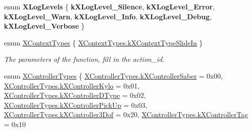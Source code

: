 \begin{DoxyCompactItemize}
\item 
\mbox{\label{class_ximmerse_1_1_input_system_1_1_x_device_plugin_a6e7bd1d7c7750fcdeb271defafc86bea}} 
enum {\bfseries X\+Log\+Levels} \{ \newline
{\bfseries k\+X\+Log\+Level\+\_\+\+Silence}, 
{\bfseries k\+X\+Log\+Level\+\_\+\+Error}, 
{\bfseries k\+X\+Log\+Level\+\_\+\+Warn}, 
{\bfseries k\+X\+Log\+Level\+\_\+\+Info}, 
\newline
{\bfseries k\+X\+Log\+Level\+\_\+\+Debug}, 
{\bfseries k\+X\+Log\+Level\+\_\+\+Verbose}
 \}
\item 
enum \mbox{\hyperlink{class_ximmerse_1_1_input_system_1_1_x_device_plugin_ab11d2f358709ce84ff419eae941f16d6}{X\+Context\+Types}} \{ \mbox{\hyperlink{class_ximmerse_1_1_input_system_1_1_x_device_plugin_ab11d2f358709ce84ff419eae941f16d6a4aad06142d58cf0d02c54672d88f2632}{X\+Context\+Types.\+k\+X\+Context\+Type\+Slide\+In}}
 \}
\begin{DoxyCompactList}\small\item\em The parameters of the function, fill in the action\+\_\+id. \end{DoxyCompactList}\item 
enum \mbox{\hyperlink{class_ximmerse_1_1_input_system_1_1_x_device_plugin_aca129c7953e73c8cb1d7500c1ccc4b50}{X\+Controller\+Types}} \{ \newline
\mbox{\hyperlink{class_ximmerse_1_1_input_system_1_1_x_device_plugin_aca129c7953e73c8cb1d7500c1ccc4b50a71eae6030eae97660c86120090eb2db3}{X\+Controller\+Types.\+k\+X\+Controller\+Saber}} = 0x00, 
\mbox{\hyperlink{class_ximmerse_1_1_input_system_1_1_x_device_plugin_aca129c7953e73c8cb1d7500c1ccc4b50ac03ca1404661c6a6065071e33fb413a6}{X\+Controller\+Types.\+k\+X\+Controller\+Kylo}} = 0x01, 
\mbox{\hyperlink{class_ximmerse_1_1_input_system_1_1_x_device_plugin_aca129c7953e73c8cb1d7500c1ccc4b50a0abb9c2799237bff7946f70d9fe4dc28}{X\+Controller\+Types.\+k\+X\+Controller\+D\+Type}} = 0x02, 
\mbox{\hyperlink{class_ximmerse_1_1_input_system_1_1_x_device_plugin_aca129c7953e73c8cb1d7500c1ccc4b50a99d7cd155cd35b2aa20ee40bf7874c74}{X\+Controller\+Types.\+k\+X\+Controller\+Pick\+Up}} = 0x03, 
\newline
\mbox{\hyperlink{class_ximmerse_1_1_input_system_1_1_x_device_plugin_aca129c7953e73c8cb1d7500c1ccc4b50a33b87d435aea3fa33d2dc0baa2fbc70b}{X\+Controller\+Types.\+k\+X\+Controller3\+Dof}} = 0x20, 
\mbox{\hyperlink{class_ximmerse_1_1_input_system_1_1_x_device_plugin_aca129c7953e73c8cb1d7500c1ccc4b50a809ed54e1e6ad933ba90ca2f0f27c9de}{X\+Controller\+Types.\+k\+X\+Controller\+Tag}} = 0x10

\end{DoxyCompactItemize}
